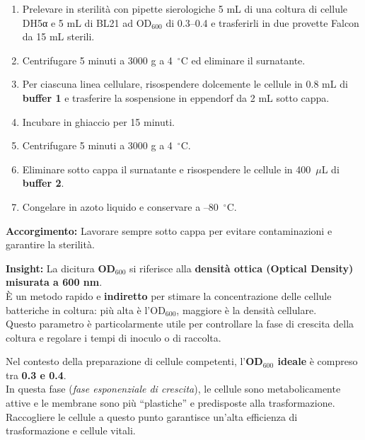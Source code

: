 \begin{enumerate}
  \item Prelevare in sterilità con pipette sierologiche 5 mL di una coltura di cellule DH5α e 5 mL di BL21 ad OD$_{600}$ di 0.3–0.4 e trasferirli in due provette Falcon da 15 mL sterili.
  \item Centrifugare 5 minuti a 3000 g a 4~$^\circ$C ed eliminare il surnatante.
  \item Per ciascuna linea cellulare, risospendere dolcemente le cellule in 0.8 mL di \textbf{buffer 1} e trasferire la sospensione in eppendorf da 2 mL sotto cappa.
  \item Incubare in ghiaccio per 15 minuti.
  \item Centrifugare 5 minuti a 3000 g a 4~$^\circ$C.
  \item Eliminare sotto cappa il surnatante e risospendere le cellule in 400~$\mu$L di \textbf{buffer 2}.
  \item Congelare in azoto liquido e conservare a –80~$^\circ$C.
\end{enumerate}

\begin{accorgimentoBox}
  \textbf{Accorgimento:} Lavorare sempre sotto cappa per evitare contaminazioni e garantire la sterilità.
\end{accorgimentoBox}


\begin{insightBox}
  \textbf{Insight:} La dicitura \textbf{OD$_{600}$} si riferisce alla \textbf{densità ottica (Optical Density) misurata a 600 nm}.\\
  È un metodo rapido e \textbf{indiretto} per stimare la concentrazione delle cellule batteriche in coltura: più alta è l’OD$_{600}$, maggiore è la densità cellulare.\\
  Questo parametro è particolarmente utile per controllare la fase di crescita della coltura e regolare i tempi di inoculo o di raccolta.

  \vspace{0.5em}

  Nel contesto della preparazione di cellule competenti, l’\textbf{OD$_{600}$ ideale} è compreso tra \textbf{0.3 e 0.4}.\\
  In questa fase (\textit{fase esponenziale di crescita}), le cellule sono metabolicamente attive e le membrane sono più “plastiche” e predisposte alla trasformazione.\\
  Raccogliere le cellule a questo punto garantisce un’alta efficienza di trasformazione e cellule vitali.
\end{insightBox}

